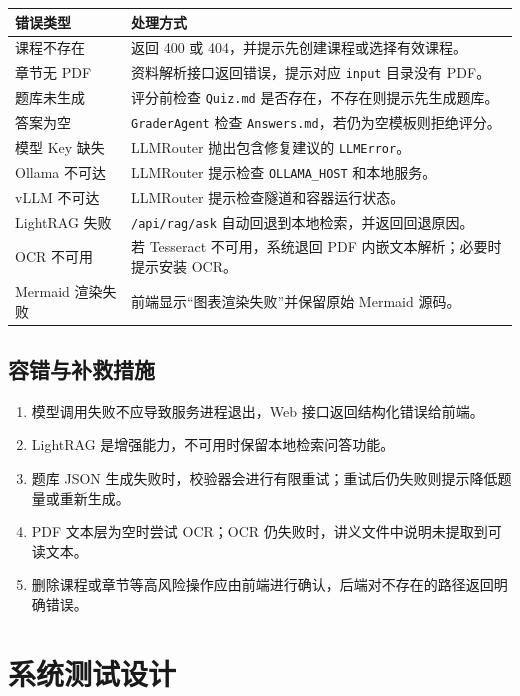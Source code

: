 \documentclass[UTF8,fontset=windows,zihao=-4,openany]{ctexrep}
\begin{document}
\begin{longtable}{p{}p{}}
\toprule
错误类型 & 处理方式\\
\midrule
课程不存在 & 返回 400 或 404，并提示先创建课程或选择有效课程。\\
章节无 PDF & 资料解析接口返回错误，提示对应 \texttt{input} 目录没有 PDF。\\
题库未生成 & 评分前检查 \texttt{Quiz.md} 是否存在，不存在则提示先生成题库。\\
答案为空 & \texttt{GraderAgent} 检查 \texttt{Answers.md}，若仍为空模板则拒绝评分。\\
模型 Key 缺失 & LLMRouter 抛出包含修复建议的 \texttt{LLMError}。\\
Ollama 不可达 & LLMRouter 提示检查 \texttt{OLLAMA\_HOST} 和本地服务。\\
vLLM 不可达 & LLMRouter 提示检查隧道和容器运行状态。\\
LightRAG 失败 & \texttt{/api/rag/ask} 自动回退到本地检索，并返回回退原因。\\
OCR 不可用 & 若 Tesseract 不可用，系统退回 PDF 内嵌文本解析；必要时提示安装 OCR。\\
Mermaid 渲染失败 & 前端显示“图表渲染失败”并保留原始 Mermaid 源码。\\
\bottomrule
\end{longtable}

\section{容错与补救措施}

\begin{enumerate}
  \item 模型调用失败不应导致服务进程退出，Web 接口返回结构化错误给前端。
  \item LightRAG 是增强能力，不可用时保留本地检索问答功能。
  \item 题库 JSON 生成失败时，校验器会进行有限重试；重试后仍失败则提示降低题量或重新生成。
  \item PDF 文本层为空时尝试 OCR；OCR 仍失败时，讲义文件中说明未提取到可读文本。
  \item 删除课程或章节等高风险操作应由前端进行确认，后端对不存在的路径返回明确错误。
\end{enumerate}

\chapter{系统测试设计}
\end{document}
